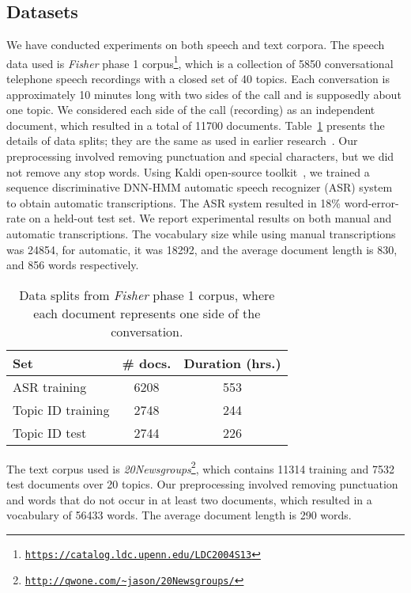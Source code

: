 \documentclass[journal]{IEEEtran}
\begin{document}
\subsection{Datasets}
\label{ssec:data}
We have conducted experiments on both speech and text corpora. The speech 
data used is \textit{Fisher} phase 1 
corpus\footnote{\texttt{\url{https://catalog.ldc.upenn.edu/LDC2004S13}}}, 
which is a collection of 5850 conversational telephone speech recordings with
a closed set of 40 topics. Each conversation is approximately 10 minutes long
with two sides of the call and is supposedly about one topic.
We considered each side of the call (recording) as an independent document,
which resulted in a total of 11700 documents. Table~\ref{tab:data} presents
the details of data splits; they are the same as used in earlier
research~\cite{Hazen:2007:ASRU,Hazen:2011:MCE_topic_ID,May:2015:mivec}. Our
preprocessing involved removing punctuation and special characters, but we
did not remove any stop words. Using Kaldi open-source
toolkit~\cite{Kaldi:2011:ASRU}, we trained a sequence discriminative DNN-HMM
automatic speech recognizer (ASR) system~\cite{Karel:2013} to obtain
automatic transcriptions. The ASR system resulted in 18\% word-error-rate on
a held-out test set. We report experimental results on both manual and
automatic transcriptions. The vocabulary size while using manual
transcriptions was 24854, for automatic, it was 18292, and the average
document length is 830, and 856 words respectively.
\begin{table}[t!]
  \begin{center}
    \caption{\label{tab:data}Data splits from \textit{Fisher} phase 1 corpus, 
    where each document represents one side of the conversation.}
    \begin{tabular}{lcc} \toprule
      \bf{Set} & \bf{\# docs.} & \bf{Duration (hrs.)}  \\ \midrule
      ASR training      & 6208 & 553 \\
      Topic ID training & 2748 & 244 \\
      Topic ID test     & 2744 & 226 \\ \bottomrule
    \end{tabular}
  \end{center}
\end{table}

The text corpus used is 
\textit{20Newsgroups}\footnote{\texttt{\url{http://qwone.com/~jason/20Newsgroups/}}},
which contains 11314 training and 7532 test documents 
over 20 topics. Our preprocessing involved removing punctuation and 
words that do not occur in at least two documents, which resulted in a 
vocabulary of 56433 words. The average document length is 290 words.
\end{document}
